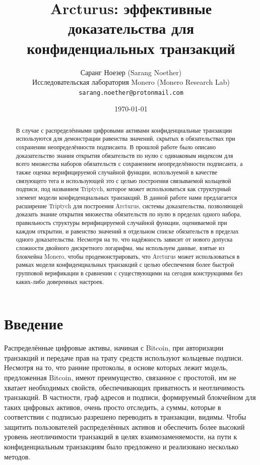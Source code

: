 \documentclass{article}
\title{Arcturus: эффективные доказательства для конфиденциальных транзакций}
\author{Саранг Ноезер (Sarang Noether) \\ Исследовательская лаборатория Monero (Monero Research Lab) \\ \texttt{sarang.noether@protonmail.com}}
\date{\today}
\theoremstyle{definition}
\begin{document}
\maketitle


\begin{abstract}
В случае с распределёнными цифровыми активами конфиденциальные транзакции используются для демонстрации равенства значений, скрытых в обязательствах при сохранении неопределённости подписанта.
В прошлой работе было описано доказательство знания открытия обязательств по нулю с одинаковым индексом для всего множества наборов обязательств с сохранением неопределённости подписанта, а также оценка верифицируемой случайной функции, используемой в качестве связующего тега и использующей это с целью построения связываемой кольцевой подписи, под названием Triptych, которое может использоваться как структурный элемент модели конфиденциальных транзакций.
В данной работе нами предлагается расширение Triptych для построения Arcturus, системы доказательства, позволяющей доказать знание открытия множества обязательств по нулю в пределах одного набора, правильность структуры верифицируемой случайной функции, оцениваемой при каждом открытии, и равенство значений в отдельном списке обязательств в пределах одного доказательства. Несмотря на то, что надёжность зависит от нового допуска сложности двойного дискретного логарифма, мы используем данные, взятые из блокчейна Monero, чтобы продемонстрировать, что Arcturus может использоваться в рамках модели конфиденциальных транзакций с целью обеспечения более быстрой групповой верификации в сравнении с существующими на сегодня конструкциями без каких-либо доверенных настроек.
\end{abstract}


\section{Введение}
Распределённые цифровые активы, начиная с Bitcoin, при авторизации транзакций и передаче прав на трату средств используют кольцевые подписи.
Несмотря на то, что ранние протоколы, в основе которых лежит модель, предложенная Bitcoin, имеют преимущество, связанное с простотой, им не хватает необходимых свойств, обеспечивающих приватность и неотличимость транзакций. В частности, граф адресов и подписи, формируемый блокчейном для таких цифровых активов, очень просто отследить, а суммы, которые в соответствии с подписью разрешено переводить в транзакции, видимы.
Чтобы защитить пользователей распределённых активов и обеспечить более высокий уровень неотличимости транзакций в целях взаимозаменяемости, на пути к конфиденциальным транзакциям было предложено и реализовано несколько методов.
\end{document}

